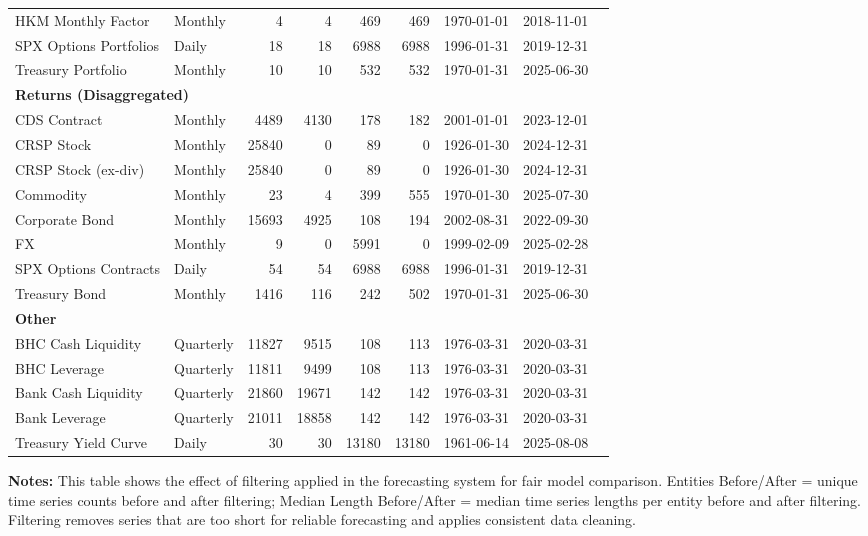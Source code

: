 \begin{table}[htbp]
\begin{tabular}{@{}llrrrrlll@{}}
HKM Monthly Factor & Monthly & 4 & 4 & 469 & 469 & 1970-01-01 & 2018-11-01 \\
SPX Options Portfolios & Daily & 18 & 18 & 6988 & 6988 & 1996-01-31 & 2019-12-31 \\
Treasury Portfolio & Monthly & 10 & 10 & 532 & 532 & 1970-01-31 & 2025-06-30 \\
\midrule
\multicolumn{8}{l}{\textbf{Returns (Disaggregated)}} \\
CDS Contract & Monthly & 4489 & 4130 & 178 & 182 & 2001-01-01 & 2023-12-01 \\
CRSP Stock & Monthly & 25840 & 0 & 89 & 0 & 1926-01-30 & 2024-12-31 \\
CRSP Stock (ex-div) & Monthly & 25840 & 0 & 89 & 0 & 1926-01-30 & 2024-12-31 \\
Commodity & Monthly & 23 & 4 & 399 & 555 & 1970-01-30 & 2025-07-30 \\
Corporate Bond & Monthly & 15693 & 4925 & 108 & 194 & 2002-08-31 & 2022-09-30 \\
FX & Monthly & 9 & 0 & 5991 & 0 & 1999-02-09 & 2025-02-28 \\
SPX Options Contracts & Daily & 54 & 54 & 6988 & 6988 & 1996-01-31 & 2019-12-31 \\
Treasury Bond & Monthly & 1416 & 116 & 242 & 502 & 1970-01-31 & 2025-06-30 \\
\midrule
\multicolumn{8}{l}{\textbf{Other}} \\
BHC Cash Liquidity & Quarterly & 11827 & 9515 & 108 & 113 & 1976-03-31 & 2020-03-31 \\
BHC Leverage & Quarterly & 11811 & 9499 & 108 & 113 & 1976-03-31 & 2020-03-31 \\
Bank Cash Liquidity & Quarterly & 21860 & 19671 & 142 & 142 & 1976-03-31 & 2020-03-31 \\
Bank Leverage & Quarterly & 21011 & 18858 & 142 & 142 & 1976-03-31 & 2020-03-31 \\
Treasury Yield Curve & Daily & 30 & 30 & 13180 & 13180 & 1961-06-14 & 2025-08-08 \\
\bottomrule
\end{tabular}
\vspace{0.1cm}
\begin{minipage}{\textwidth}
\scriptsize
\textbf{Notes:} This table shows the effect of filtering applied in the forecasting system for fair model comparison. 
Entities Before/After = unique time series counts before and after filtering; 
Median Length Before/After = median time series lengths per entity before and after filtering. 
Filtering removes series that are too short for reliable forecasting and applies consistent data cleaning.
\end{minipage}
\end{table}